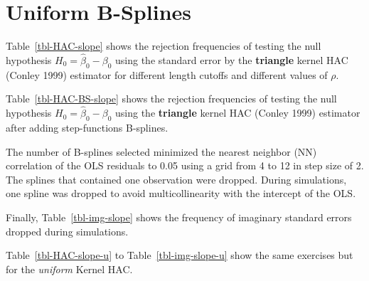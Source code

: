 \documentclass[
]{article}
\begin{document}
\section{Uniform B-Splines}\label{uniform-b-splines}

Table~\ref{tbl-HAC-slope} shows the rejection frequencies of testing the
null hypothesis \(H_0=\hat\beta_0-\beta_0\) using the standard error by
the \textbf{triangle} kernel HAC (Conley 1999) estimator for different
length cutoffs and different values of \(\rho\).

Table~\ref{tbl-HAC-BS-slope} shows the rejection frequencies of testing
the null hypothesis \(H_0=\hat\beta_0-\beta_0\) using the
\textbf{triangle} kernel HAC (Conley 1999) estimator after adding
step-functions B-splines.

The number of B-splines selected minimized the nearest neighbor (NN)
correlation of the OLS residuals to 0.05 using a grid from 4 to 12 in
step size of 2. The splines that contained one observation were dropped.
During simulations, one spline was dropped to avoid multicollinearity
with the intercept of the OLS.

Finally, Table~\ref{tbl-img-slope} shows the frequency of imaginary
standard errors dropped during simulations.

Table~\ref{tbl-HAC-slope-u} to Table~\ref{tbl-img-slope-u} show the same
exercises but for the \emph{uniform} Kernel HAC.
\end{document}
